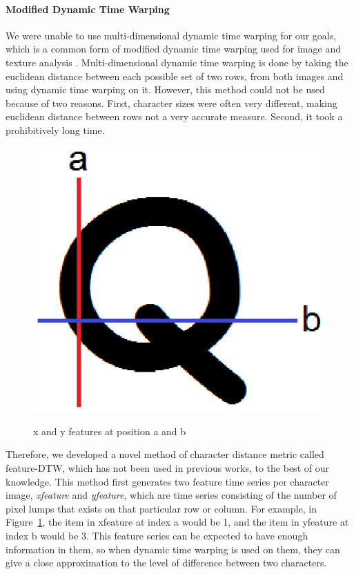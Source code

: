\documentclass[12pt]{article}
\begin{document}
	\paragraph{Modified Dynamic Time Warping} We were unable to use multi-dimensional dynamic time warping for our goals, which is a common form of modified dynamic time warping used for image and texture analysis \cite{De_Mello_Gondra_2008}. Multi-dimensional dynamic time warping is done by taking the euclidean distance between each possible set of two rows, from both images and using dynamic time warping on it. However, this method could not be used because of two reasons. First, character sizes were often very different, making euclidean distance between rows not a very accurate measure. Second, it took a prohibitively long time.

	\begin{figure}[htbp!]
		\centering
		\includegraphics[scale=0.7]{xyfeatures.eps}
		\label{figure:xyfeatures}
		\caption{x and y features at position a and b}
		\end{figure}
		
	Therefore, we developed a novel method of character distance metric called feature-DTW, which has not been used in previous works, to the best of our knowledge. This method first generates two feature time series per character image, \textit{xfeature} and \textit{yfeature}, which are time series consisting of the number of pixel lumps that exists on that particular row or column. For example, in Figure~\ref{figure:xyfeatures}, the item in xfeature at index a would be 1, and the item in yfeature at index b would be 3. This feature series can be expected to have enough information in them, so when dynamic time warping is used on them, they can give a close approximation to the level of difference between two characters.
	
\end{document}
